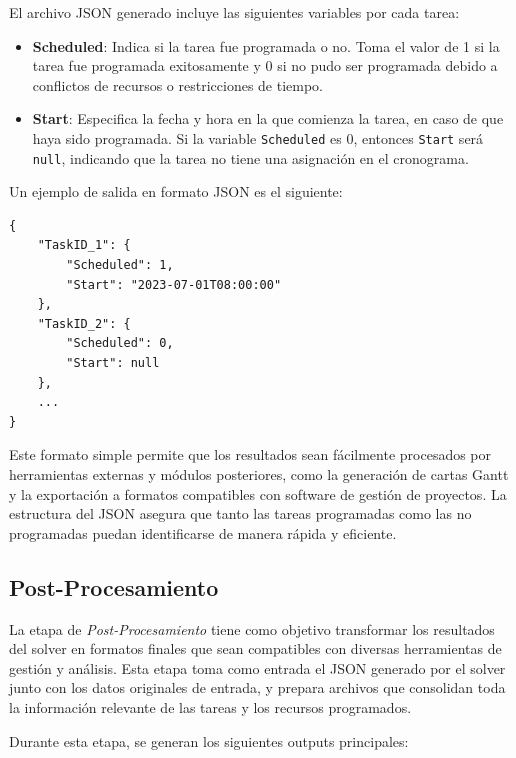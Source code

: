 \documentclass{article}
\begin{document}
El archivo JSON generado incluye las siguientes variables por cada tarea:

\begin{itemize}
    \item \textbf{Scheduled}: Indica si la tarea fue programada o no. Toma el valor de 1 si la tarea fue programada exitosamente y 0 si no pudo ser programada debido a conflictos de recursos o restricciones de tiempo.
    
    \item \textbf{Start}: Especifica la fecha y hora en la que comienza la tarea, en caso de que haya sido programada. Si la variable \texttt{Scheduled} es 0, entonces \texttt{Start} será \texttt{null}, indicando que la tarea no tiene una asignación en el cronograma.
\end{itemize}

Un ejemplo de salida en formato JSON es el siguiente:

\begin{verbatim}
{
    "TaskID_1": {
        "Scheduled": 1,
        "Start": "2023-07-01T08:00:00"
    },
    "TaskID_2": {
        "Scheduled": 0,
        "Start": null
    },
    ...
}
\end{verbatim}

Este formato simple permite que los resultados sean fácilmente procesados por herramientas externas y módulos posteriores, como la generación de cartas Gantt y la exportación a formatos compatibles con software de gestión de proyectos. La estructura del JSON asegura que tanto las tareas programadas como las no programadas puedan identificarse de manera rápida y eficiente.

\subsection{Post-Procesamiento}

La etapa de \textit{Post-Procesamiento} tiene como objetivo transformar los resultados del solver en formatos finales que sean compatibles con diversas herramientas de gestión y análisis. Esta etapa toma como entrada el JSON generado por el solver junto con los datos originales de entrada, y prepara archivos que consolidan toda la información relevante de las tareas y los recursos programados.

Durante esta etapa, se generan los siguientes outputs principales:
\end{document}
